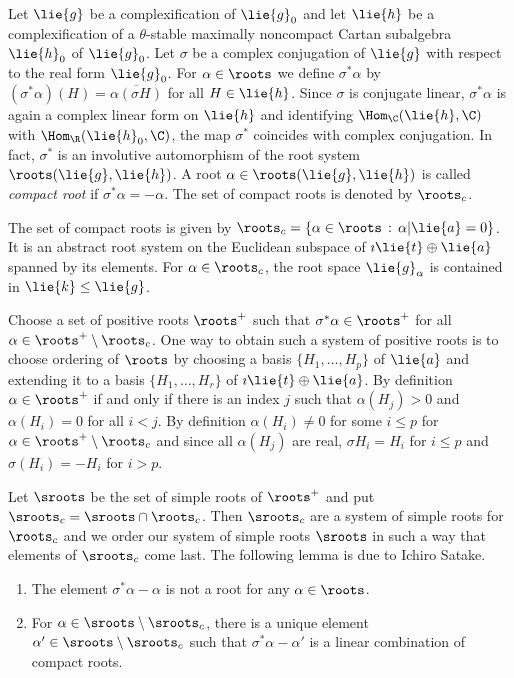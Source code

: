 Let $\lie{g}$ be a complexification of $\lie{g}_0$ and let $\lie{h}$ be a complexification of a $\theta$-stable maximally noncompact Cartan subalgebra $\lie{h}_0$ of $\lie{g}_0$. Let $\sigma$ be a complex conjugation of $\lie{g}$ with respect to the real form $\lie{g}_0$. For $\alpha\in\roots$ we define $\sigma^* \alpha$ by $(\sigma^* \alpha) (H) = \overline{\alpha(\sigma H)}$ for all $H\in\lie{h}$. Since $\sigma$ is conjugate linear, $\sigma^*\alpha$ is again a complex linear form on $\lie{h}$ and identifying $\Hom_\C(\lie{h},\C)$ with $\Hom_\R(\lie{h}_0,\C)$, the map $\sigma^*$ coincides with complex conjugation. In fact, $\sigma^*$ is an involutive automorphism of the root system $\roots(\lie{g},\lie{h})$. A root $\alpha \in \roots(\lie{g},\lie{h})$ is called \emph{compact root} if $\sigma^*\alpha = -\alpha$. The set of compact roots is denoted by $\roots_c$.

\begin{proposition}
 The set of compact roots is given by $\roots_c = \{ \alpha \in \roots \,:\,\alpha|\lie{a} = 0 \}$. It is an abstract root system on the Euclidean subspace of $\imath \lie{t}\oplus \lie{a}$ spanned by its elements. For $\alpha\in\roots_c$, the root space $\lie{g}_\alpha$ is contained in $\lie{k}\leq \lie{g}$.
\end{proposition}


Choose a set of positive roots $\roots^+$ such that $\sigma^* \alpha \in \roots^+$ for all $\alpha\in\roots^+\setminus\roots_c$. One way to obtain such a system of positive roots is to choose ordering of $\roots$ by choosing a basis $\{H_1,\ldots, H_p\}$ of $\lie{a}$ and extending it to a basis $\{H_1,\ldots,H_r\}$ of $\imath\lie{t}\oplus\lie{a}$. By definition $\alpha\in\roots^+$ if and only if there is an index $j$ such that $\alpha(H_j) > 0$ and $\alpha(H_i) = 0 $ for all $i<j$. By definition $\alpha(H_i)\neq 0$ for some $i\leq p$ for $\alpha \in \roots^+\setminus \roots_c$ and since all $\alpha(H_j)$ are real, $\sigma H_i = H_i$ for $i\leq p$ and $\sigma(H_i) = -H_i$ for $i>p$.

Let $\sroots$ be the set of simple roots of $\roots^+$ and put $\sroots_c = \sroots \cap \roots_c$. Then $\sroots_c$ are a system of simple roots for $\roots_c$ and we order our system of simple roots $\sroots$ in such a way that elements of $\sroots_c$ come last. The following lemma is due to Ichir{o} Satake.
\begin{lemma}
\begin{enumerate}
 \item The element $\sigma^*\alpha - \alpha$ is not a root for any $\alpha\in\roots$.
 \item For $\alpha \in \sroots \setminus \sroots_c$, there is a unique element $\alpha'\in\sroots\setminus\sroots_c$ such that $\sigma^*\alpha-\alpha'$ is a linear combination of compact roots.
\end{enumerate}
\end{lemma}

